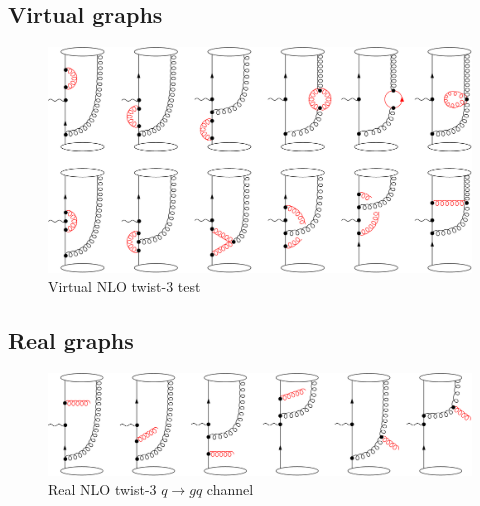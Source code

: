 \subsection{Virtual graphs}
\begin{figure}
    \centering
    \includegraphics[width=0.99\linewidth]{fig/VirtNLOTw3.png}
    \caption{Virtual NLO twist-3 test }
    \label{fig:Virt NLO tw3}
    \end{figure}
\subsection{Real graphs}
\begin{figure}
    \centering
    \includegraphics[width=0.99\linewidth]{fig/RealNLOTw3q2qg.png}
    \caption{Real NLO twist-3 $q\to gq $ channel }
    \label{fig:Real NLO tw3}
\end{figure}


